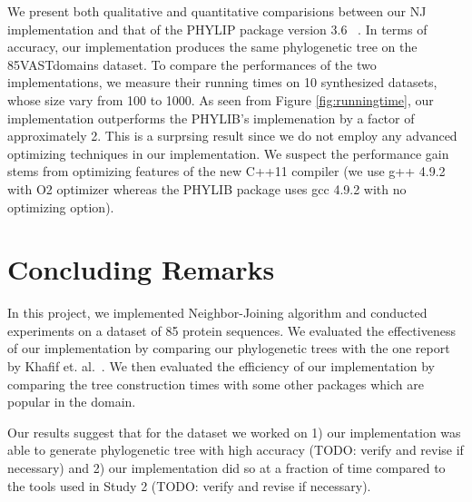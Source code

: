\documentclass[11pt,letterpaper]{article}
\theoremstyle{definition}
\begin{document}
We present both qualitative and quantitative comparisions between our NJ implementation and that of the PHYLIP package version 3.6 ~\cite{felsenstein2005phylip}. In terms of accuracy, our implementation produces the same phylogenetic tree on the 85VASTdomains dataset. To compare the performances of the two implementations, we measure their running times on 10 synthesized datasets, whose size vary from 100 to 1000. As seen from Figure \ref{fig:runningtime}, our implementation outperforms the PHYLIB's implemenation by a factor of approximately 2. This is a surprsing result since we do not employ any advanced optimizing techniques in our implementation. We suspect the performance gain stems from optimizing features of the new C++11 compiler (we use g++ 4.9.2 with O2 optimizer whereas the PHYLIB package uses gcc 4.9.2 with no optimizing option).  

\section{Concluding Remarks}

In this project, we implemented Neighbor-Joining algorithm and conducted experiments on a dataset of 85 protein sequences. We evaluated the effectiveness of our implementation by comparing our phylogenetic trees with the one report by Khafif et. al.~\cite{khafif2014identification}. We then evaluated the efficiency of our implementation by comparing the tree construction times with some other packages which are popular in the domain.

Our results suggest that for the dataset we worked on 1) our implementation was able to generate phylogenetic tree with high accuracy (TODO: verify and revise if necessary) and 2) our implementation did so at a fraction of time compared to the tools used in Study 2 (TODO: verify and revise if necessary).



\end{document}
